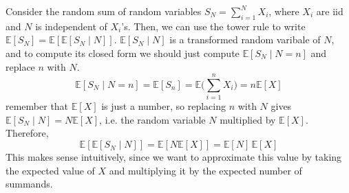 \documentclass{article}
\begin{document}
    \begin{example}
      Consider the random sum of random variables $S_N = \sum_{i=1}^N X_i$, where $X_i$ are iid and $N$ is independent of $X_i$'s. Then, we can use the tower rule to write $\mathbb{E}[S_N] = \mathbb{E}[\mathbb{E}[S_N \mid N]]$. $\mathbb{E}[S_N \mid N]$ is a transformed random varibale of $N$, and to compute its closed form we should just compute $\mathbb{E}[S_N \mid N = n]$ and replace $n$ with $N$. 
      \begin{equation}
        \mathbb{E}[S_N \mid N = n] = \mathbb{E}[S_n] = \mathbb{E} \bigg( \sum_{i=1}^n X_i \bigg) = n \mathbb{E}[X]
      \end{equation}
      remember that $\mathbb{E}[X]$ is just a number, so replacing $n$ with $N$ gives $\mathbb{E}[S_N \mid N] = N \mathbb{E}[X]$, i.e. the random variable $N$ multiplied by $\mathbb{E}[X]$. Therefore, 
      \begin{equation}
        \mathbb{E}[\mathbb{E}[S_N \mid N]] = \mathbb{E}[N \mathbb{E}[X]] = \mathbb{E}[N] \, \mathbb{E}[X]
      \end{equation}
      This makes sense intuitively, since we want to approximate this value by taking the expected value of $X$ and multiplying it by the expected number of summands. 
    \end{example}
\end{document}
